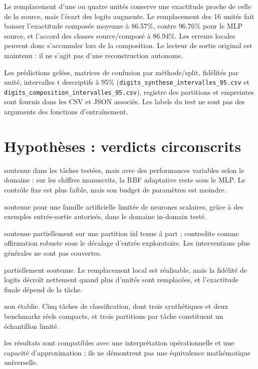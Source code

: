 \documentclass[11pt,a4paper]{article}
\begin{document}
Le remplacement d'une ou quatre unités conserve une exactitude proche de celle de la source, mais l'écart des logits augmente. Le remplacement des 16 unités fait baisser l'exactitude composée moyenne à 86.57\%, contre 96.76\% pour le MLP source, et l'accord des classes source/composé à 86.94\%. Les erreurs locales peuvent donc s'accumuler lors de la composition. Le lecteur de sortie original est maintenu : il ne s'agit pas d'une reconstruction autonome.

Les prédictions gelées, matrices de confusion par méthode/split, fidélités par unité, intervalles t descriptifs à 95\% (\texttt{digits\_synthese\_intervalles\_95.csv} et \texttt{digits\_composition\_intervalles\_95.csv}), registre des partitions et empreintes sont fournis dans les CSV et JSON associés. Les labels du test ne sont pas des arguments des fonctions d'entraînement.

\section{Hypothèses : verdicts circonscrits}
\begin{description}[leftmargin=1.3cm,style=nextline]
\item[H1 — Apprentissage de tâche :] soutenue dans les tâches testées, mais avec des performances variables selon le domaine : sur les chiffres manuscrits, la RBF adaptative reste sous le MLP. Le contrôle fixe est plus faible, mais son budget de paramètres est moindre.
\item[H2 — Imitation de neurones :] soutenue pour une famille artificielle limitée de neurones scalaires, grâce à des exemples entrée-sortie autorisés, dans le domaine in-domain testé.
\item[H3 — Généralisation :] soutenue partiellement sur une partition iid tenue à part ; contredite comme affirmation robuste sous le décalage d'entrée exploratoire. Les interventions plus générales ne sont pas couvertes.
\item[H4 — Composition :] partiellement soutenue. Le remplacement local est réalisable, mais la fidélité de logits décroît nettement quand plus d'unités sont remplacées, et l'exactitude finale dépend de la tâche.
\item[H5 — Généralité :] non établie. Cinq tâches de classification, dont trois synthétiques et deux benchmarks réels compacts, et trois partitions par tâche constituent un échantillon limité.
\item[H6 — Neurone cas particulier de sonde :] les résultats sont compatibles avec une interprétation opérationnelle et une capacité d'approximation ; ils ne démontrent pas une équivalence mathématique universelle.
\end{description}
\end{document}
